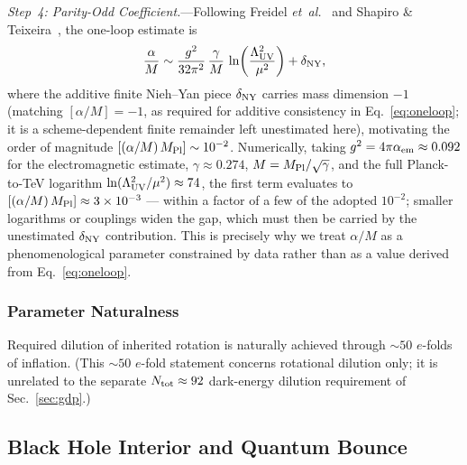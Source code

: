 \documentclass[aps,prd,twocolumn,superscriptaddress,showpacs,preprintnumbers,nofootinbib,longbibliography,floatfix]{revtex4-2}
\newcommand{\MPl}{M_{\rm Pl}}
\newcommand{\etal}{\textit{et~al.}}
\begin{document}
\textit{Step~4: Parity-Odd Coefficient.}---Following Freidel \etal~\cite{Freidel2005}
and Shapiro \& Teixeira~\cite{ShapiroTeixeira2014}, the one-loop estimate is
\begin{equation}\label{eq:oneloop}
\frac{\alpha}{M}\sim \frac{g^2}{32\pi^2}\,\frac{\gamma}{M}\,\ln\!\left(\frac{\Lambda_{\rm UV}^2}{\mu^2}\right)+\delta_{\rm NY},
\end{equation}
where the additive finite Nieh--Yan piece $\delta_{\rm NY}$ carries mass
dimension $-1$ (matching $[\alpha/M]=-1$, as required for additive
consistency in Eq.~\eqref{eq:oneloop}; it is a scheme-dependent finite
remainder left unestimated here),
motivating the order of magnitude $[(\alpha/M)\,\MPl]\sim 10^{-2}$.
Numerically, taking $g^2 = 4\pi\alpha_{\rm em} \approx 0.092$ for the
electromagnetic estimate, $\gamma \approx 0.274$, $M = \MPl/\sqrt{\gamma}$,
and the full Planck-to-TeV logarithm
$\ln(\Lambda_{\rm UV}^2/\mu^2) \approx 74$, the first term evaluates to
$[(\alpha/M)\,\MPl] \approx 3\times 10^{-3}$ --- within a factor of a few
of the adopted $10^{-2}$; smaller logarithms or couplings widen the gap,
which must then be carried by the unestimated $\delta_{\rm NY}$
contribution. This is precisely why we treat
$\alpha/M$ as a phenomenological parameter constrained by data rather
than as a value derived from Eq.~\eqref{eq:oneloop}.

\subsubsection{Parameter Naturalness}\label{sec:naturalness}
Required dilution of inherited
rotation is naturally achieved through $\sim 50$ $e$-folds of inflation.
(This $\sim 50$ $e$-fold statement concerns rotational dilution only; it
is unrelated to the separate $N_{\rm tot}\approx 92$ dark-energy dilution
requirement of Sec.~\ref{sec:gdp}.)


\subsection{Black Hole Interior and Quantum Bounce}\label{sec:bounce}
\end{document}
